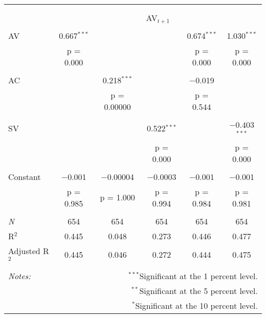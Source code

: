 
\begin{tabular}{@{\extracolsep{5pt}}lccccc} 
\\[-1.8ex]\hline 
\hline \\[-1.8ex] 
\\[-1.8ex] & \multicolumn{5}{c}{AV$_{t+1}$} \\ 
\hline \\[-1.8ex] 
 AV & 0.667$^{***}$ &  &  & 0.674$^{***}$ & 1.030$^{***}$ \\ 
  & p = 0.000 &  &  & p = 0.000 & p = 0.000 \\ 
  & & & & & \\ 
 AC &  & 0.218$^{***}$ &  & $-$0.019 &  \\ 
  &  & p = 0.00000 &  & p = 0.544 &  \\ 
  & & & & & \\ 
 SV &  &  & 0.522$^{***}$ &  & $-$0.403$^{***}$ \\ 
  &  &  & p = 0.000 &  & p = 0.000 \\ 
  & & & & & \\ 
 Constant & $-$0.001 & $-$0.00004 & $-$0.0003 & $-$0.001 & $-$0.001 \\ 
  & p = 0.985 & p = 1.000 & p = 0.994 & p = 0.984 & p = 0.981 \\ 
  & & & & & \\ 
\textit{N} & 654 & 654 & 654 & 654 & 654 \\ 
R$^{2}$ & 0.445 & 0.048 & 0.273 & 0.446 & 0.477 \\ 
Adjusted R$^{2}$ & 0.445 & 0.046 & 0.272 & 0.444 & 0.475 \\ 
\hline 
\hline \\[-1.8ex] 
\textit{Notes:} & \multicolumn{5}{r}{$^{***}$Significant at the 1 percent level.} \\ 
 & \multicolumn{5}{r}{$^{**}$Significant at the 5 percent level.} \\ 
 & \multicolumn{5}{r}{$^{*}$Significant at the 10 percent level.} \\ 
\end{tabular} 
